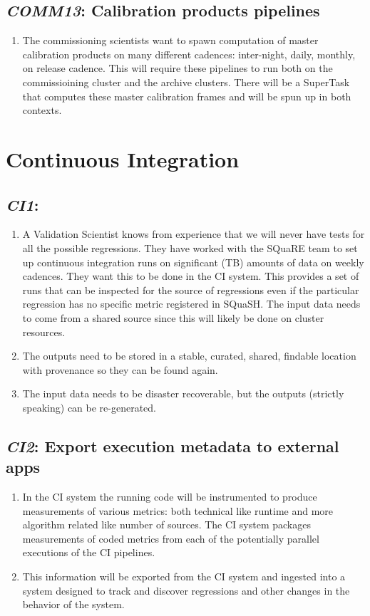 \documentclass[DM,toc,lsstdraft]{lsstdoc}
\newcommand{\usecase}[3]{%
\subsection{\emph{#1}: #2}
\begin{enumerate}[label=\alph*.]
#3
\end{enumerate}
}
\begin{document}
\usecase{COMM13}{Calibration products pipelines}{%

\item
The commissioning scientists want to spawn computation of master calibration products on many different cadences: inter-night, daily, monthly, on release cadence.
This will require these pipelines to run both on the commissioining cluster and the archive clusters.
There will be a SuperTask that computes these master calibration frames and will be spun up in both contexts.

}

\section{Continuous Integration}

\usecase{CI1}{}{%

\item
A Validation Scientist knows from experience that we will never have tests for all the possible regressions.
They have worked with the SQuaRE team to set up continuous integration runs on significant (TB) amounts of data on weekly cadences.
They want this to be done in the CI system.
This provides a set of runs that can be inspected for the source of regressions even if the particular regression has no specific metric registered in SQuaSH.
The input data needs to come from a shared source since this will likely be done on cluster resources.

\item
The outputs need to be stored in a stable, curated, shared, findable location with provenance so they can be found again.

\item
The input data needs to be disaster recoverable, but the outputs (strictly speaking) can be re-generated.

}

\usecase{CI2}{Export execution metadata to external apps}{%

\item
In the CI system the running code will be instrumented to produce measurements of various metrics: both technical like runtime and more algorithm related like number of sources.
The CI system packages measurements of coded metrics from each of the potentially parallel executions of the CI pipelines.

\item
This information will be exported from the CI system and ingested into a system designed to track and discover regressions and other changes in the behavior of the system.

}
\end{document}
